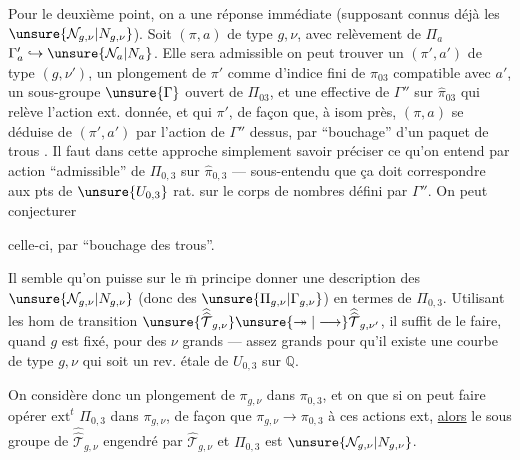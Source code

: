 
Pour le deuxième point, on a une réponse immédiate (supposant connus déjà les
$\unsure{\mathcal{N}_{g,\nu}|N_{g,\nu}}$). Soit  $(\pi,a)$ de type $g,\nu$,
avec  relèvement  de $\Pi_a$ 
$\Gamma'_a\hookrightarrow \unsure{\mathcal{N}_a|N_a}$.
Elle sera admissible  on peut trouver
un $(\pi',a')$ de type $(g,\nu')$,  un
plongement de $\pi'$ comme  d'indice fini de $\widehat{\pi}_{03}$ compatible avec $a'$,
 un sous-groupe $\unsure{\Gamma}$ ouvert  de $\Pi_{03}$, et
une  effective  de $\Gamma''$ 
sur $\widehat{\pi}_{03}$ qui
relève l'action ext. donnée, et qui
 $\pi'$, de façon que, à isom
près, $(\pi,a)$ 
se déduise de $(\pi',a')$
par l'action de $\Gamma''$ dessus, par ``bouchage''
d'un paquet de trous . Il faut
dans cette approche simplement savoir
préciser  ce qu'on entend par
action ``admissible'' de  $\Pi_{0,3}$ sur $\widehat{\pi}_{0,3}$
--- sous-entendu que ça doit correspondre
aux pts de $\unsure{U_{0,3}}$ rat. sur  le corps
de nombres défini par $\Gamma''$. On peut conjecturer



celle-ci, par ``bouchage des trous''.

Il semble qu'on puisse sur le $\overline{\mathrm m}$
principe donner une description des
$\unsure{\mathcal{N}_{g,\nu}|N_{g,\nu}}$ (donc des $\unsure{\Pi_{g,\nu}|\Gamma_{g,\nu}}$)
en termes de
$\Pi_{0,3}$. Utilisant les hom de transition
$\unsure{\widehat{\widehat{\mathcal{T}}}_{g,\nu}}
\unsure{\twoheadrightarrow|\longrightarrow}
\widehat{\widehat{\mathcal{T}}}_{g,\nu'}$,
il suffit de le
faire, quand $g$ est fixé, pour des $\nu$
grands --- assez grands pour qu'il
existe une courbe  de type $g,\nu$ 
qui soit un rev. étale de $U_{0,3}$ sur $\mathbb{Q}$.

On considère donc un plongement 
de $\pi_{g,\nu}$ dans $\pi_{0,3}$, et on
 que si  on peut faire
opérer $\mathrm{ext}^{t}$ $\Pi_{0,3}$ dans $\pi_{g,\nu}$, de
façon que $\pi_{g,\nu}\longrightarrow\pi_{0,3}$ 
à ces actions ext, \uline{alors} le sous
groupe de $\widehat{\widehat{\mathcal{T}}}_{g,\nu}$ engendré par
$\widehat{\mathcal{T}}_{g,\nu}$ et
$\Pi_{0,3}$ est 
$\unsure{\mathcal{N}_{g,\nu}|N_{g,\nu}}$.

